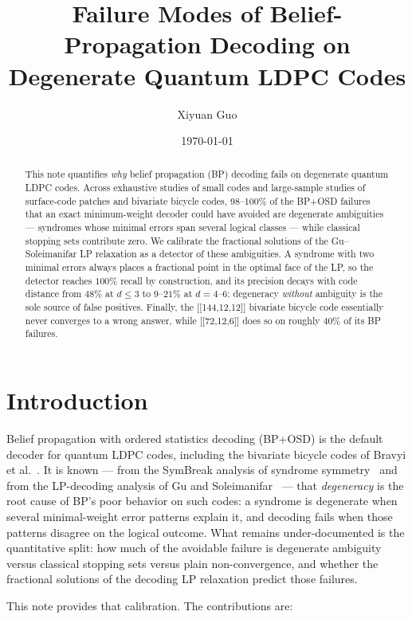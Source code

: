 \documentclass[10pt]{article}
\title{Failure Modes of Belief-Propagation Decoding on\\
Degenerate Quantum LDPC Codes}
\author{Xiyuan Guo}
\date{\today}
\begin{document}
\maketitle

\begin{abstract}
This note quantifies \emph{why} belief propagation (BP) decoding fails
on degenerate quantum LDPC codes. Across exhaustive studies of small
codes and large-sample studies of surface-code patches and bivariate
bicycle codes, 98--100\% of the BP+OSD failures that an exact
minimum-weight decoder could have avoided are degenerate ambiguities
--- syndromes whose minimal errors span several logical classes ---
while classical stopping sets contribute zero. We calibrate the
fractional solutions of the Gu--Soleimanifar LP relaxation as a
detector of these ambiguities. A syndrome with two minimal errors
always places a fractional point in the optimal face of the LP, so the
detector reaches $100\%$ recall by construction, and its precision
decays with code distance from $48\%$ at $d \le 3$ to $9$--$21\%$ at
$d = 4$--$6$: degeneracy \emph{without} ambiguity is the sole source of
false positives. Finally, the [[144,12,12]] bivariate bicycle code
essentially never converges to a wrong answer, while [[72,12,6]] does
so on roughly $40\%$ of its BP failures.
\end{abstract}

\section{Introduction}

Belief propagation with ordered statistics decoding (BP+OSD) is the
default decoder for quantum LDPC codes, including the bivariate
bicycle codes of Bravyi et al.~\cite{bravyi2024}. It is known --- from
the SymBreak analysis of syndrome symmetry~\cite{symbreak} and from the
LP-decoding analysis of Gu and Soleimanifar~\cite{gusoleimanifar} ---
that \emph{degeneracy} is the root cause of BP's poor behavior on such
codes: a syndrome is degenerate when several minimal-weight error
patterns explain it, and decoding fails when those patterns disagree on
the logical outcome. What remains under-documented is the quantitative
split: how much of the avoidable failure is degenerate ambiguity versus
classical stopping sets versus plain non-convergence, and whether the
fractional solutions of the decoding LP relaxation predict those
failures.

This note provides that calibration. The contributions are:
\end{document}
